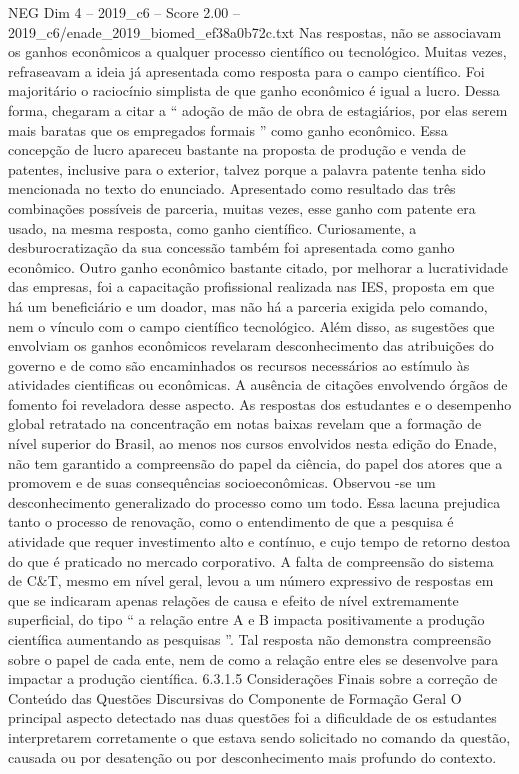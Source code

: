 \begin{textsample}{NEG Dim 4 – 2019\_c6 – Score 2.00 – 2019\_c6/enade\_2019\_biomed\_ef38a0b72c.txt}
Nas respostas, não se associavam os ganhos econômicos a qualquer processo científico ou tecnológico.
Muitas vezes, refraseavam a ideia já apresentada como resposta para o campo científico.
Foi majoritário o raciocínio simplista de que ganho econômico é igual a lucro.
Dessa forma, chegaram a citar a “ adoção de mão de obra de estagiários, por elas serem mais baratas que os empregados formais ” como ganho econômico.
Essa concepção de lucro apareceu bastante na proposta de produção e venda de patentes, inclusive para o exterior, talvez porque a palavra patente tenha sido mencionada no texto do enunciado.
Apresentado como resultado das três combinações possíveis de parceria, muitas vezes, esse ganho com patente era usado, na mesma resposta, como ganho científico.
Curiosamente, a desburocratização da sua concessão também foi apresentada como ganho econômico.
Outro ganho econômico bastante citado, por melhorar a lucratividade das empresas, foi a capacitação profissional realizada nas IES, proposta em que há um beneficiário e um doador, mas não há a parceria exigida pelo comando, nem o vínculo com o campo científico tecnológico.
Além disso, as sugestões que envolviam os ganhos econômicos revelaram desconhecimento das atribuições do governo e de como são encaminhados os recursos necessários ao estímulo às atividades cientificas ou econômicas.
A ausência de citações envolvendo órgãos de fomento foi reveladora desse aspecto.
As respostas dos estudantes e o desempenho global retratado na concentração em notas baixas revelam que a formação de nível superior do Brasil, ao menos nos cursos envolvidos nesta edição do Enade, não tem garantido a compreensão do papel da ciência, do papel dos atores que a promovem e de suas consequências socioeconômicas.
Observou -se um desconhecimento generalizado do processo como um todo.
Essa lacuna prejudica tanto o processo de renovação, como o entendimento de que a pesquisa é atividade que requer investimento alto e contínuo, e cujo tempo de retorno destoa do que é praticado no mercado corporativo.
A falta de compreensão do sistema de C\&T, mesmo em nível geral, levou a um número expressivo de respostas em que se indicaram apenas relações de causa e efeito de nível extremamente superficial, do tipo “ a relação entre A e B impacta positivamente a produção científica aumentando as pesquisas ”.
Tal resposta não demonstra compreensão sobre o papel de cada ente, nem de como a relação entre eles se desenvolve para impactar a produção científica. 6.3.1.5 Considerações Finais sobre a correção de Conteúdo das Questões Discursivas do Componente de Formação Geral O principal aspecto detectado nas duas questões foi a dificuldade de os estudantes interpretarem corretamente o que estava sendo solicitado no comando da questão, causada ou por desatenção ou por desconhecimento mais profundo do contexto.

\end{textsample}
